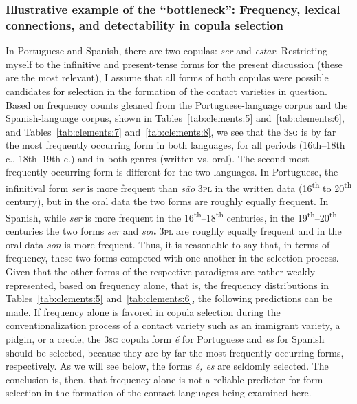 \documentclass[output=paper,colorlinks,citecolor=brown]{langscibook}
\begin{document}
\subsubsection{Illustrative example of the “bottleneck”: Frequency, lexical connections, and detectability in copula selection}
In Portuguese and Spanish, there are two copulas: \textit{ser} and \textit{estar}. Restricting myself to the infinitive and present-tense forms for the present discussion (these are the most relevant), I assume that all forms of both copulas were possible candidates for selection in the formation of the contact varieties in question. Based on frequency counts gleaned from the  \citet{DaviesFerreira2006} Portuguese-language corpus and the \citet{Davies2002} Spanish-language corpus, shown in Tables~\ref{tab:clements:5} and~\ref{tab:clements:6},
 and Tables~\ref{tab:clements:7} and~\ref{tab:clements:8}, we see that the 3\textsc{sg} is by far the most frequently occurring form in both languages, for all periods (16th--18th c., 18th--19th c.) and in both genres (written vs. oral). The second most frequently occurring form is different for the two languages. In Portuguese, the infinitival form \textit{ser} is more frequent than \textit{são} 3\textsc{pl} in the written data (16\textsuperscript{th} to 20\textsuperscript{th} century), but in the oral data the two forms are roughly equally frequent. In Spanish, while \textit{ser} is more frequent in the 16\textsuperscript{th}–18\textsuperscript{th} centuries, in the 19\textsuperscript{th}–20\textsuperscript{th} centuries the two forms \textit{ser} and \textit{son} 3\textsc{pl} are roughly equally frequent and in the oral data \textit{son} is more frequent. Thus, it is reasonable to say that, in terms of frequency, these two forms competed with one another in the selection process. Given that the other forms of the respective paradigms are rather weakly represented, based on frequency alone, that is, the frequency distributions in Tables~\ref{tab:clements:5} and~\ref{tab:clements:6}, the following predictions can be made.  If frequency alone is favored in copula selection during the conventionalization process of a contact variety such as an immigrant variety, a pidgin, or a creole, the 3\textsc{sg} copula form \textit{é} for Portuguese and \textit{es} for Spanish should be selected, because they are by far the most frequently occurring forms, respectively. As we will see below, the forms \textit{é, es} are seldomly selected. The conclusion is, then, that frequency alone is not a reliable predictor for form selection in the formation of the contact languages being examined here.
\end{document}
